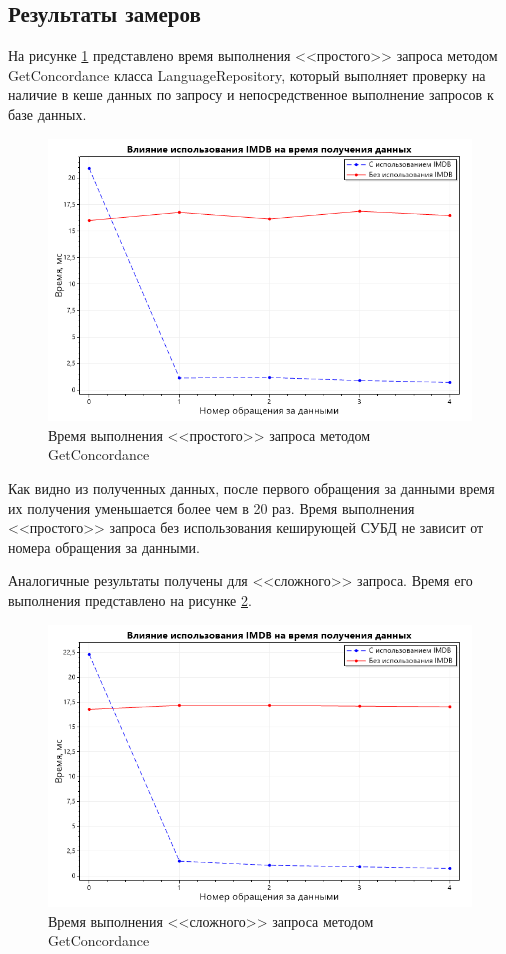 \subsection{Результаты замеров}
На рисунке \ref{cache-comparison} представлено время выполнения <<простого>> запроса методом GetConcordance класса LanguageRepository, который выполняет проверку на наличие в кеше данных по запросу и непосредственное выполнение запросов к базе данных.

\captionsetup{singlelinecheck = false, justification=centering}
\begin{figure}[ht]
	\centering
	\includegraphics[scale=0.8]{img/plots/cache-comparison}
	\caption{Время выполнения <<простого>> запроса методом GetConcordance}
	\label{cache-comparison}
\end{figure}\clearpage

Как видно из полученных данных, после первого обращения за данными время их получения уменьшается более чем в 20 раз. Время выполнения <<простого>> запроса без использования кеширующей СУБД не зависит от номера обращения за данными.

Аналогичные результаты получены для <<сложного>> запроса. Время его выполнения представлено на рисунке \ref{cache-comparison-complex}.
\begin{figure}[ht]
	\centering
	\includegraphics[scale=0.8]{img/plots/cache-comparison-complex}
	\caption{Время выполнения <<сложного>> запроса методом GetConcordance}
	\label{cache-comparison-complex}
\end{figure}

